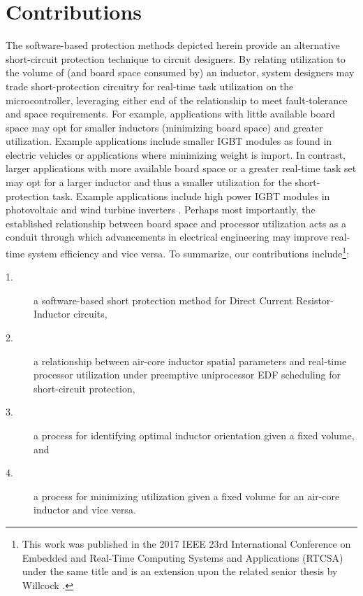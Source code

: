 \documentclass[11pt,oneside]{report}
\begin{document}
    \section*{Contributions}
    The software-based protection methods depicted herein provide an alternative short-circuit protection technique to circuit designers. By relating utilization to the volume of (and board space consumed by) an inductor, system designers may trade short-protection circuitry for real-time task utilization on the microcontroller, leveraging either end of the relationship to meet fault-tolerance and space requirements. For example, applications with little available board space may opt for smaller inductors (minimizing board space) and greater utilization. Example applications include smaller IGBT modules as found in electric vehicles or applications where minimizing weight is import\cite{IGBTvehicle}. In contrast, larger applications with more available board space or a greater real-time task set may opt for a larger inductor and thus a smaller utilization for the short-protection task. Example applications include high power IGBT modules in photovoltaic and wind turbine inverters \cite{photoVoltaic}\cite{hiPowerIGBTwind}. Perhaps most importantly, the established relationship between board space and processor utilization acts as a conduit through which advancements in electrical engineering may improve real-time system efficiency and vice versa.
    To summarize, our contributions include\footnote{This work was published in the 2017 IEEE 23rd International Conference on Embedded and Real-Time Computing Systems and Applications (RTCSA) under the same title \cite{tufc} and is an extension upon the related senior thesis by Willcock \cite{seniorThesis}.}:%
    \begin{description}
    \item [1.] a software-based short protection method for Direct Current Resistor-Inductor circuits,
    \item [2.] a relationship between air-core inductor spatial parameters and real-time processor utilization under preemptive uniprocessor EDF scheduling for short-circuit protection,
    \item [3.] a process for identifying optimal inductor orientation given a fixed volume, and
    \item [4.] a process for minimizing utilization given a fixed volume for an air-core inductor and vice versa.
    \end{description}
    
\end{document}
